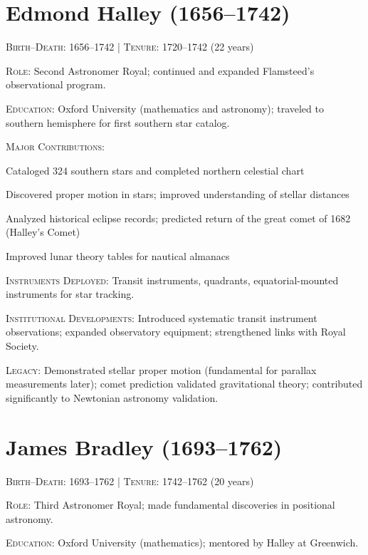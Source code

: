 \medskip

\section*{Edmond Halley (1656--1742)}
\textsc{Birth--Death}: 1656--1742 | \textsc{Tenure}: 1720--1742 (22 years)

\noindent\textsc{Role}: Second Astronomer Royal; continued and expanded Flamsteed's observational program.

\noindent\textsc{Education}: Oxford University (mathematics and astronomy); traveled to southern hemisphere for first southern star catalog.

\noindent\textsc{Major Contributions}:
\begin{enumerate*}[label=(\arabic*)]
\item Cataloged 324 southern stars and completed northern celestial chart
\item Discovered proper motion in stars; improved understanding of stellar distances
\item Analyzed historical eclipse records; predicted return of the great comet of 1682 (Halley's Comet)
\item Improved lunar theory tables for nautical almanacs
\end{enumerate*}

\noindent\textsc{Instruments Deployed}: Transit instruments, quadrants, equatorial-mounted instruments for star tracking.

\noindent\textsc{Institutional Developments}: Introduced systematic transit instrument observations; expanded observatory equipment; strengthened links with Royal Society.

\noindent\textsc{Legacy}: Demonstrated stellar proper motion (fundamental for parallax measurements later); comet prediction validated gravitational theory; contributed significantly to Newtonian astronomy validation.

\medskip

\section*{James Bradley (1693--1762)}
\textsc{Birth--Death}: 1693--1762 | \textsc{Tenure}: 1742--1762 (20 years)

\noindent\textsc{Role}: Third Astronomer Royal; made fundamental discoveries in positional astronomy.

\noindent\textsc{Education}: Oxford University (mathematics); mentored by Halley at Greenwich.

